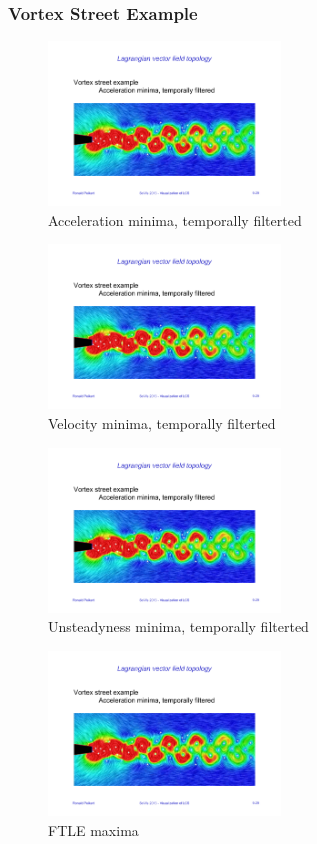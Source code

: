 \subsubsection{Vortex Street Example}
\begin{figure}[H]
    \centering
    \includegraphics[width=0.55\textwidth,page=1]{img/09_vortex_street}
    \caption{Acceleration minima, temporally filterted}
\end{figure}
\begin{figure}[H]
    \centering
    \includegraphics[width=0.55\textwidth,page=2]{img/09_vortex_street}
    \caption{Velocity minima, temporally filterted}
\end{figure}
\begin{figure}[H]
    \centering
    \includegraphics[width=0.55\textwidth,page=3]{img/09_vortex_street}
    \caption{Unsteadyness minima, temporally filterted}
\end{figure}
\begin{figure}[H]
    \centering
    \includegraphics[width=0.55\textwidth,page=4]{img/09_vortex_street}
    \caption{FTLE maxima}
\end{figure}
